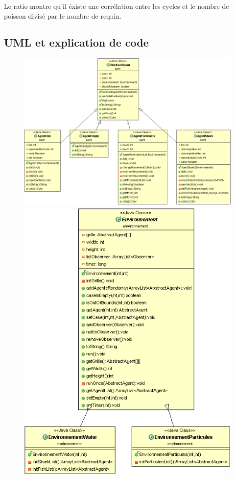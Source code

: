 \documentclass[a4paper,12pt]{report}
\begin{document}
Le ratio montre qu'il éxiste une corrélation entre les cycles et le nombre de poisson divisé par le nombre de requin.
\subsection*{UML et explication de code}

\begin{figure}[!ht]
	\center
	\includegraphics[scale=0.4]{./image/a.png}
	\includegraphics[scale=0.4]{./image/b.png}
\end{figure}
\end{document}
